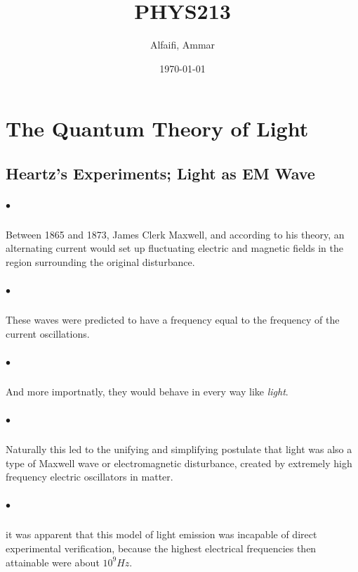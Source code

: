 \documentclass[a4paper]{report}
\title{PHYS213}
\author{Alfaifi, Ammar}
\date{\today}
\begin{document}
    \maketitle
    \chapter{The Quantum Theory of Light}
        \section{Heartz's Experiments; Light as EM Wave}
            
            \paragraph{$\bullet$} Between 1865 and 1873, James Clerk Maxwell, and according to his theory, 
            an alternating current would set up fluctuating electric and magnetic fields in the 
            region surrounding the original disturbance.
            \paragraph{$\bullet$} These waves were predicted to have a frequency equal to the frequency of the current oscillations.
            \paragraph{$\bullet$} And more importnatly, they would behave in every way like \textit{light}.
            \paragraph{$\bullet$} Naturally this led to the unifying and simplifying postulate that light was also a 
            type of Maxwell wave or electromagnetic disturbance, created by extremely high frequency electric oscillators in matter.
            \paragraph{$\bullet$} it was apparent that this model of light emission was incapable of direct experimental 
            verification, because the highest electrical frequencies then attainable were about $10^9Hz$.
\end{document}
